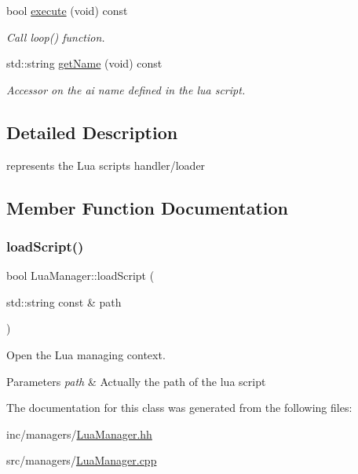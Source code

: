 \begin{DoxyCompactItemize}
\mbox{\label{classLuaManager_af9bdb289e5e90cf610164d7254795b4a}} 
bool \hyperlink{classLuaManager_af9bdb289e5e90cf610164d7254795b4a}{execute} (void) const
\begin{DoxyCompactList}\small\item\em Call loop() function. \end{DoxyCompactList}\item 
\mbox{\label{classLuaManager_aab52ca0bbfc8941043740f501dbc85e6}} 
std\+::string \hyperlink{classLuaManager_aab52ca0bbfc8941043740f501dbc85e6}{get\+Name} (void) const
\begin{DoxyCompactList}\small\item\em Accessor on the ai name defined in the lua script. \end{DoxyCompactList}\end{DoxyCompactItemize}


\subsection{Detailed Description}
represents the Lua scripts handler/loader 

\subsection{Member Function Documentation}
\mbox{\label{classLuaManager_a113433dbaed2e770ed510610de8b6c4f}} 
\subsubsection{\texorpdfstring{load\+Script()}{loadScript()}}
{\footnotesize\ttfamily bool Lua\+Manager\+::load\+Script (\begin{DoxyParamCaption}\item[{std\+::string const \&}]{path }\end{DoxyParamCaption})}



Open the Lua managing context. 


\begin{DoxyParams}{Parameters}
{\em path} & Actually the path of the lua script \\
\hline
\end{DoxyParams}


The documentation for this class was generated from the following files\+:\begin{DoxyCompactItemize}
\item 
inc/managers/\hyperlink{LuaManager_8hh}{Lua\+Manager.\+hh}\item 
src/managers/\hyperlink{LuaManager_8cpp}{Lua\+Manager.\+cpp}\end{DoxyCompactItemize}
